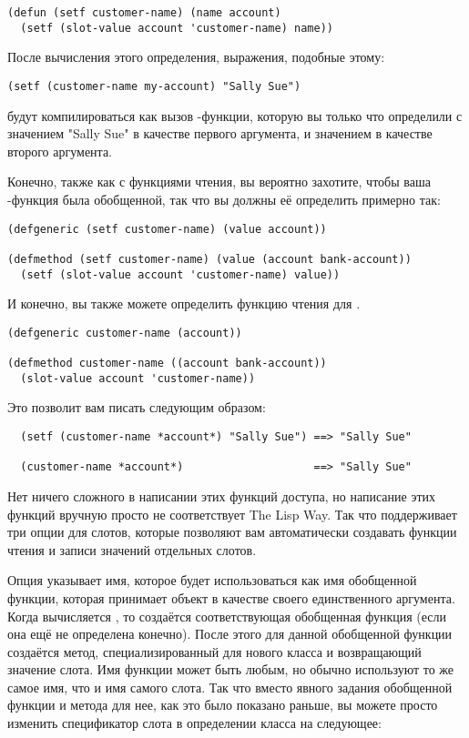 \begin{lstlisting}
(defun (setf customer-name) (name account)
  (setf (slot-value account 'customer-name) name))
\end{lstlisting}

После вычисления этого определения, выражения, подобные этому:

\begin{lstlisting}
(setf (customer-name my-account) "Sally Sue")
\end{lstlisting}

будут компилироваться как вызов -функции, которую вы только что определили с
значением "Sally Sue" в качестве первого аргумента, и значением  в
качестве второго аргумента.

Конечно, также как с функциями чтения, вы вероятно захотите, чтобы ваша
-функция была обобщенной, так что вы должны её определить примерно так:

\begin{lstlisting}
(defgeneric (setf customer-name) (value account))

(defmethod (setf customer-name) (value (account bank-account))
  (setf (slot-value account 'customer-name) value))
\end{lstlisting}

И конечно, вы также можете определить функцию чтения для .

\begin{lstlisting}
(defgeneric customer-name (account))

(defmethod customer-name ((account bank-account))
  (slot-value account 'customer-name))
\end{lstlisting}

Это позволит вам писать следующим образом:

\begin{verbatim}
  (setf (customer-name *account*) "Sally Sue") ==> "Sally Sue"

  (customer-name *account*)                    ==> "Sally Sue"
\end{verbatim}

Нет ничего сложного в написании этих функций доступа, но написание этих функций вручную
просто не соответствует The Lisp Way.  Так что  поддерживает три опции для
слотов, которые позволяют вам автоматически создавать функции чтения и записи значений
отдельных слотов.

Опция  указывает имя, которое будет использоваться как имя обобщенной
функции, которая принимает объект в качестве своего единственного аргумента.  Когда
вычисляется , то создаётся соответствующая обобщенная функция (если она ещё
не определена конечно).  После этого для данной обобщенной функции создаётся метод,
специализированный для нового класса и возвращающий значение слота.  Имя функции может
быть любым, но обычно используют то же самое имя, что и имя самого слота.  Так что вместо
явного задания обобщенной функции  и метода для нее, как это было показано
раньше, вы можете просто изменить спецификатор слота  в определении класса
 на следующее:

